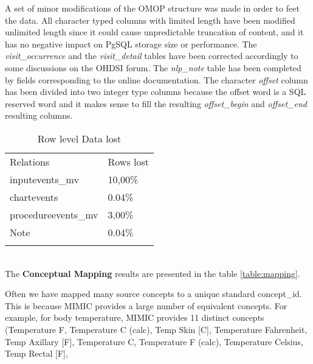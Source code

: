 A set of minor modifications of the OMOP structure was made in order to feet
the data. All character typed columns with limited length have been modified
unlimited length since it could cause unpredictable truncation of content, and
it has no negative impact on PgSQL storage size or performance. The
\textit{visit\_occurrence} and the \textit{visit\_detail} tables have been
corrected accordingly to some discussions on the OHDSI forum. The
\textit{nlp\_note} table has been completed by fields corresponding to the
online documentation. The character \textit{offset} column has been divided
into two integer type columns because the offset word is a SQL reserved word
and it makes sense to fill the resulting \textit{offset\_begin} and
\textit{offset\_end} resulting columns.

%
%

\begin{table*}[t]
\caption{Row level Data lost}{
\begin{tabular}{@{}ll@{}}\toprule
Relations           & Rows lost        \\\colrule
inputevents\_mv     & 10,00\%          \\
chartevents         & 0.04\%           \\
procedureevents\_mv & 3,00\%           \\
Note                & 0.04\%           \\\botrule
\end{tabular}}
\label{table:lostrows}
\end{table*}

~
\\


The \textbf{Conceptual Mapping} results are presented in the table
\ref{table:mapping}. 

Often we have mapped many source concepts to a unique standard concept\_id.
This is because MIMIC provides a large number of equivalent concepts. For
example, for body temperature, MIMIC provides 11 distinct concepts (Temperature
F, Temperature C (calc), Temp Skin [C], Temperature Fahrenheit, Temp Axillary
[F], Temperature C, Temperature F (calc), Temperature Celsius, Temp Rectal [F], 

